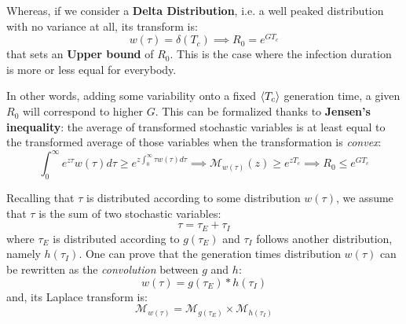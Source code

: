 \documentclass[../main/main.tex]{subfiles}
\begin{document}
Whereas, if we consider a \textbf{Delta Distribution}, i.e. a well peaked distribution with no variance at all, its transform is:
\begin{equation*}
    w(\tau) = \delta(T_c) \implies R_0 = e^{GT_c}
\end{equation*}
that sets an \textbf{Upper bound} of $R_0$. This is the case where the infection duration is more or less equal for everybody.

In other words, adding some variability onto a fixed $\expval{T_c}$ generation time, a given $R_0$ will correspond to higher $G$. This can be formalized thanks to \textbf{Jensen's inequality}: the average of transformed stochastic variables is at least equal to the transformed average of those variables when the transformation is \textit{convex}:
\begin{equation}
    \int_0^\infty e^{z\tau} w(\tau) d\tau \geqslant e^{z\int_0^\infty \tau w(\tau) d\tau} \implies \mathcal{M}_{w(\tau)}(z) \geqslant e^{z T_c} \implies R_0 \leqslant e^{GT_c}
\end{equation}

Recalling that $\tau$ is distributed according to some distribution $w(\tau)$, we assume that $\tau$ is the sum of two stochastic variables:
\begin{equation*}
    \tau = \tau_E + \tau_I
\end{equation*}
where $\tau_E$ is distributed according to $g(\tau_E)$ and $\tau_I$ follows another distribution, namely $h(\tau_I)$. One can prove that the generation times distribution $w(\tau)$ can be rewritten as the \textit{convolution} between $g$ and $h$:
\begin{equation}
    w(\tau) = g(\tau_E)*h(\tau_I)
\end{equation}
and, its Laplace transform is:
\begin{equation}
    \mathcal{M}_{w(\tau)} = \mathcal{M}_{g(\tau_E)} \times \mathcal{M}_{h(\tau_I)}
\end{equation}
\end{document}
